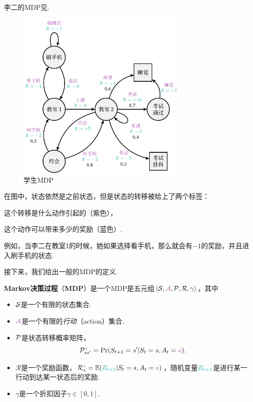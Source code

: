 \begin{example}[李二MDP]
李二的MDP见. 
\begin{figure}
    \centering
    \includegraphics[width=0.75\textwidth]{figures/Markov-chain/STD.pdf}   
    \caption{学生MDP}
    \label{fig:studentMDP}
\end{figure}
在图中，状态依然是之前状态，但是状态的转移被给上了两个标签：
\begin{enumerate*}[label=(\arabic*)]
    \item 这个转移是什么动作引起的（紫色），
    \item 这个动作可以带来多少的奖励（蓝色）. 
\end{enumerate*}
例如，当李二在教室1的时候，她如果选择看手机，那么就会有$-1$的奖励，并且进入刷手机的状态. 
\end{example}

接下来，我们给出一般的MDP的定义.
\begin{definition}
\textbf{Markov决策过程}（\textbf{MDP}）是一个MDP是五元组$\langle\calS, \light{\mathcal A}, \calP, \mathcal R, \gamma\rangle$，其中
\begin{itemize}
    \item $\mathcal S$是一个有限的状态集合.
    \item $\light{\mathcal A}$是一个有限的\emph{行动}（action）集合.
    \item $\mathcal P$是状态转移概率矩阵，
    \[\calP_{ss'}^{\light{a}} = \Pr(S_{t+1} = s' | S_t = s, A_t = \light{a}).\]
    \item $\mathcal R$是一个奖励函数，$\mathcal R_s^{\light{a}} = \E(\contrastlight{R_{t+1}} | S_t = s, A_t = \light{a})$，随机变量$\contrastlight{R_{t+1}}$是进行某一行动到达某一状态后的奖励.
    \item $\gamma$是一个折扣因子$\gamma\in[0,1]$.
\end{itemize}
\end{definition}

